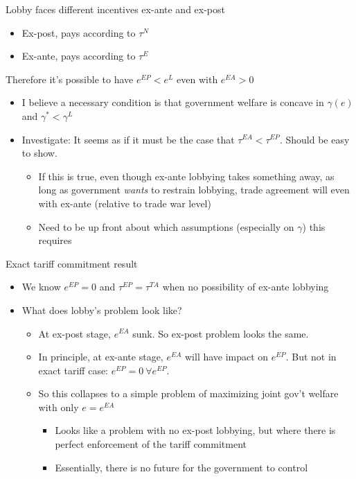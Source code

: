 \documentclass[12pt]{article}
\newcommand{\ga}{\gamma}
\begin{document}
\vskip1in
Lobby faces different incentives ex-ante and ex-post
\begin{itemize}
	\item Ex-post, pays according to $\tau^N$
	\item Ex-ante, pays according to $\tau^E$
\end{itemize}
Therefore it's possible to have $e^{EP} < e^{L}$ even with $e^{EA}>0$
\begin{itemize}
	\item I believe a necessary condition is that government welfare is concave in $\ga(e)$ and $\ga^* < \ga^L$
	\item Investigate: It seems as if it must be the case that $\tau^{EA} < \tau^{EP}$. Should be easy to show.
		\begin{itemize}
			\item If this is true, even though ex-ante lobbying takes something away, as long as government \textit{wants} to restrain lobbying, trade agreement will even with ex-ante (relative to trade war level)
			\item Need to be up front about which assumptions (especially on $\ga$) this requires
		\end{itemize}
\end{itemize}

\newpage
Exact tariff commitment result
\begin{itemize}
	\item We know $e^{EP} =0$ and $\tau^{EP} = \tau^{TA}$ when no possibility of ex-ante lobbying
	\item What does lobby's problem look like?
		\begin{itemize}
			\item At ex-post stage, $e^{EA}$ sunk. So ex-post problem looks the same.
			\item In principle, at ex-ante stage, $e^{EA}$ will have impact on $e^{EP}$. But not in exact tariff case: $e^{EP} = 0 \ \forall e^{EP}$.
			\item So this collapses to a simple problem of maximizing joint gov't welfare with only $e=e^{EA}$
				\begin{itemize}
					\item Looks like a problem with no ex-post lobbying, but where there is perfect enforcement of the tariff commitment
					\item Essentially, there is no future for the government to control
				\end{itemize}
		\end{itemize}
\end{itemize}
\end{document}
